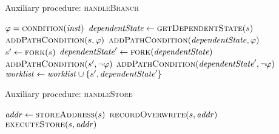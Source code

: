 \begin{algorithm}
  \caption{Auxiliary procedure: \textsc{handleBranch}
  \label{fig:aux-func-recS}}
\begin{algorithmic}[1]

 \label{alg:branch-check-recovery}
  \State $\varphi = \Call{condition}{\inst}$  \label{alg:branch-get-cond}
  \State $\dependentState \gets  \Call{getDependentState}{\workstate}$ \label{alg:get-dependent}
   \label{alg:branch-feasible-true}
    \State $\Call{addPathCondition}{\workstate, \varphi}$ \label{alg:add-pc-true-recS}
    \State $\Call{addPathCondition}{\dependentState, \varphi}$ \label{alg:add-pc-true-depS}
  \EndIf
   \label{alg:branch-feasible-false}
    \State $\workstate' \gets \Call{fork}{\workstate}$ \label{alg:branch-fork-false1}
    \State $\dependentState' \gets \Call{fork}{\dependentState}$ \label{alg:branch-fork-false2}
    \State $\Call{addPathCondition}{\workstate', \neg \varphi}$ \label{alg:add-pc-false-recS}
    \State $\Call{addPathCondition}{\dependentState', \neg \varphi}$ \label{alg:add-pc-false-depS}
    \State $\mathit{worklist} \gets \mathit{worklist} \cup \{s', \mathit{dependentState}'\}$ \label{alg:push-both}
  \EndIf
\Else
  \State {}  \label{alg:branch-normal}
\EndIf
\EndFunction
\end{algorithmic}
\end{algorithm}

\begin{algorithm}
  \caption{Auxiliary procedure: \textsc{handleStore}
  \label{fig:aux-func-recS}}
\begin{algorithmic}[1]

\State $\addr \gets \Call{storeAddress}{\workstate}$
\State $\Call{recordOverwrite}{\workstate,\addr}$     \label{alg:record-overwrite}
\State $\Call{executeStore}{\workstate,\addr}$     \label{alg:store-normal}
 \label{alg:store-check-recovery}
  \State {} \label{alg:store-udpate-dep-states}
\EndIf
\EndFunction
\end{algorithmic}
\end{algorithm}


